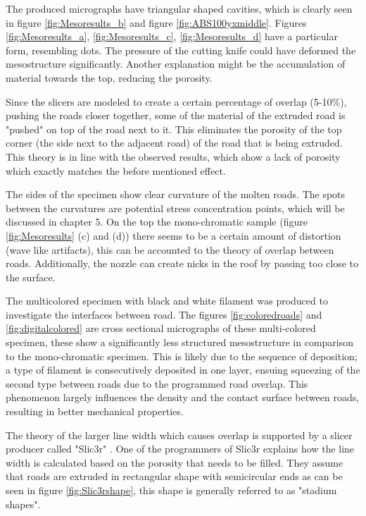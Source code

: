 The produced micrographs have triangular shaped cavities, which is clearly seen in figure \ref{fig:Mesoresults_b} and figure \ref{fig:ABS100yxmiddle}. Figures \ref{fig:Mesoresults_a}, \ref{fig:Mesoresults_c}, \ref{fig:Mesoresults_d} have a particular form, resembling dots. The pressure of the cutting knife could have deformed the mesostructure significantly. Another explanation might be the accumulation of material towards the top, reducing the porosity. 

Since the slicers are  modeled to create a certain percentage of overlap (5-10\%), pushing the roads closer together, some of the material of the extruded road is "pushed" on top of the road next to it. This eliminates the porosity of the top corner (the side next to the adjacent road) of the road that is being extruded. This theory is in line with the observed results, which show a lack of porosity which exactly matches the before mentioned effect. 

The sides of the specimen show clear curvature of the molten roads. The spots between the curvatures are potential stress concentration points, which will be discussed in chapter 5.
On the top the mono-chromatic sample (figure \ref{fig:Mesoresults} (c) and (d)) there seems to be a certain amount of distortion (wave like artifacts), this can be accounted to the theory of overlap between roads. Additionally, the nozzle can create nicks in the roof by passing too close to the surface.

The multicolored specimen with black and white filament was produced to investigate the interfaces between road. The figures \ref{fig:coloredroads} and \ref{fig:digitalcolored} are cross sectional micrographs of these multi-colored specimen, these show a significantly less structured mesostructure in comparison to the mono-chromatic specimen. This is likely due to the sequence of deposition; a type of filament is consecutively deposited in one layer,  ensuing squeezing of the second type between roads due to the programmed road overlap. This phenomenon largely influences the density and the contact surface between roads, resulting in better mechanical properties.

The theory of the larger line width which causes overlap is supported by a slicer producer called "Slic3r" \cite{GaryHodgsonSlic3rMath}. One of the programmers of Slic3r explains how the line width is calculated based on the porosity that needs to be filled. They assume that roads are extruded in rectangular shape with  semicircular ends as can be seen in figure \ref{fig:Slic3rshape}, this shape is generally referred to as "stadium shapes".

